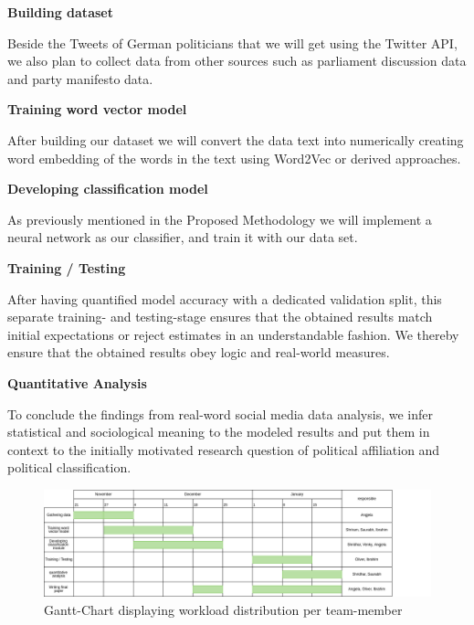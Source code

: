 \documentclass[10pt, oneside]{article}
\begin{document}
\begin{flushleft}
\textbf{Building dataset}

Beside the Tweets of German politicians that we will get using the Twitter API, we also plan to collect data from other sources such as parliament discussion data and party manifesto data.
\end{flushleft}

\begin{flushleft}
\textbf{Training word vector model}

After building our dataset we will convert the data text into numerically creating word embedding of the words in the text using Word2Vec or derived approaches.
\end{flushleft}

\begin{flushleft}
\textbf{Developing classification model}

As previously mentioned in the Proposed Methodology we will implement a neural network as our classifier, and train it with our data set.
\end{flushleft}

\begin{flushleft}
\textbf{Training / Testing}

After having quantified model accuracy with a dedicated validation split, this separate training- and testing-stage ensures that the obtained results match initial expectations or reject estimates in an understandable fashion. We thereby ensure that the obtained results obey logic and real-world measures.
\end{flushleft}

\begin{flushleft}
\textbf{Quantitative Analysis}

To conclude the findings from real-word social media data analysis, we infer statistical and sociological meaning to the modeled results and put them in context to the initially motivated research question of political affiliation and political classification.
\end{flushleft}

\begin{figure}
  \includegraphics[width=\textwidth]{gantt.png}
  \caption{Gantt-Chart displaying workload distribution per team-member}
\end{figure}




\end{document}
